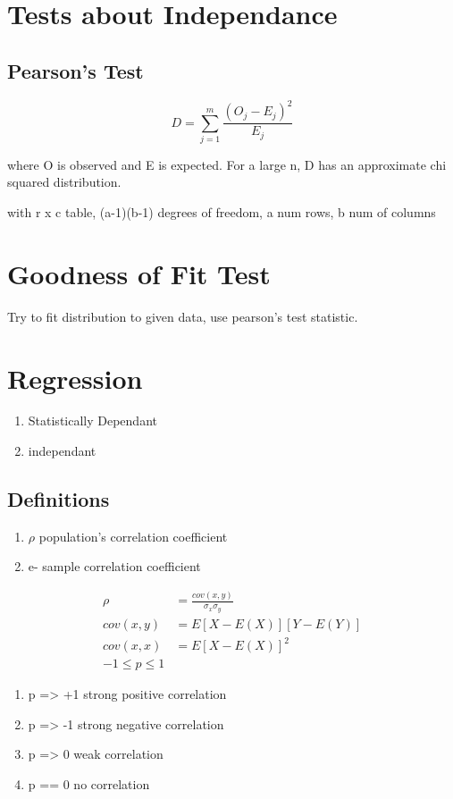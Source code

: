 \documentclass[11pt]{article}
\begin{document}
\section{Tests about Independance}
\subsection{Pearson's Test}
\begin{equation}
  D  = \sum_{j=1}^m\frac{(O_j - E_j)^2}{E_j}
\end{equation}
\par where O is observed and E is expected. For a large n, D has an approximate
chi squared distribution.
\par with r x c table, (a-1)(b-1) degrees of freedom, a num rows, b num of columns
\section{Goodness of Fit Test}
\par Try to fit distribution to given data, use pearson's test statistic.
\section{Regression}
\begin{enumerate}
  \item Statistically Dependant
  \item independant
\end{enumerate}
\subsection{Definitions}
\begin{enumerate}
  \item $\rho$ population's correlation coefficient
  \item e- sample correlation coefficient
\end{enumerate}
\begin{align*}
  \rho &= \frac{cov(x,y)}{\sigma_x\sigma_y}\\
  cov(x,y) &= E[X-E(X)][Y-E(Y)]\\
  cov(x,x) &= E[X-E(X)]^2\\
  -1\le p \le 1
\end{align*}
\begin{enumerate}
  \item p => +1 strong positive correlation
  \item p => -1 strong negative correlation
  \item p => 0 weak correlation
  \item p == 0 no correlation
\end{enumerate}
\end{document}
